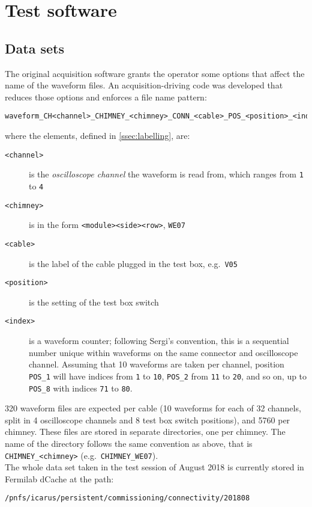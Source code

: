 \section{Test software}
\label{sec:software}


\subsection{Data sets}
\label{ssec:software:datasets}

The original acquisition software grants the operator some options that affect
the name of the waveform files. An acquisition-driving code was developed that
reduces those options and enforces a file name pattern:
\begin{verbatim}
waveform_CH<channel>_CHIMNEY_<chimney>_CONN_<cable>_POS_<position>_<index>.csv
\end{verbatim}
where the elements, defined in \cref{ssec:labelling}, are:
\begin{description}
  \item[\texttt{<channel>}] is the \emph{oscilloscope channel} the waveform is read from, which ranges from \texttt{1} to \texttt{4}
  \item[\texttt{<chimney>}] is in the form \texttt{<module><side><row>}, \texttt{WE07}
  \item[\texttt{<cable>}] is the label of the cable plugged in the test box, e.g.\ \texttt{V05}
  \item[\texttt{<position>}] is the setting of the test box switch
  \item[\texttt{<index>}] is a waveform counter;
    following Sergi's convention, this is a sequential number unique
    within waveforms on the same connector and oscilloscope channel.
    Assuming that 10 waveforms are taken per channel, position
    \texttt{POS\_1} will have indices from \texttt{1} to \texttt{10},
    \texttt{POS\_2} from \texttt{11} to \texttt{20}, and so on, up to
    \texttt{POS\_8} with indices \texttt{71} to \texttt{80}.
\end{description}

320 waveform files are expected per cable (10 waveforms for each of
32 channels, split in 4 oscilloscope channels and 8 test box switch
positions), and 5760 per chimney. These files are stored in separate
directories, one per chimney. The name of the directory follows the same
convention as above, that is \texttt{CHIMNEY\_<chimney>} (e.g.\ 
\texttt{CHIMNEY\_WE07}).
\\
The whole data set taken in the test session of August 2018 is currently
stored in Fermilab dCache at the path:
\begin{verbatim}
/pnfs/icarus/persistent/commissioning/connectivity/201808
\end{verbatim}



